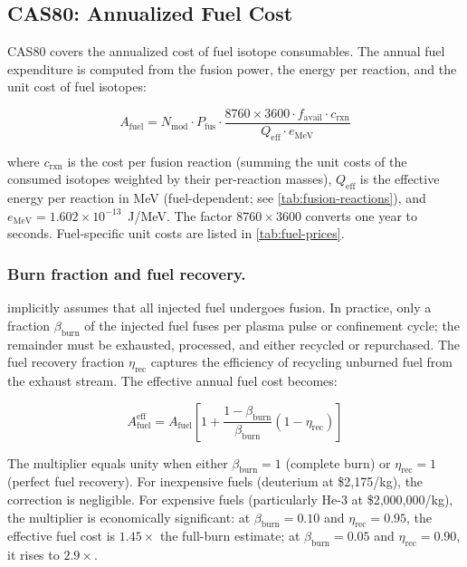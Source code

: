 \documentclass{article}
\begin{document}
\subsection{CAS80: Annualized Fuel Cost}
\label{sec:cas80}

CAS80 covers the annualized cost of fuel isotope consumables. The
annual fuel expenditure is computed from the fusion power, the
energy per reaction, and the unit cost of fuel isotopes:

\begin{equation}
\label{eq:cas80-base}
A_{\text{fuel}} = N_{\text{mod}} \cdot P_{\text{fus}} \cdot
  \frac{8760 \times 3600 \cdot f_{\text{avail}} \cdot c_{\text{rxn}}}
       {Q_{\text{eff}} \cdot e_{\text{MeV}}}
\end{equation}

\noindent where $c_{\text{rxn}}$ is the cost per fusion reaction
(summing the unit costs of the consumed isotopes weighted by their
per-reaction masses), $Q_{\text{eff}}$ is the effective energy per
reaction in MeV (fuel-dependent; see \cref{tab:fusion-reactions}), and
$e_{\text{MeV}} = 1.602 \times 10^{-13}$~J/MeV. The factor
$8760 \times 3600$ converts one year to seconds. Fuel-specific
unit costs are listed in \cref{tab:fuel-prices}.

\subsubsection{Burn fraction and fuel recovery.}
 implicitly assumes that all injected fuel
undergoes fusion. In practice, only a fraction $\beta_{\text{burn}}$
of the injected fuel fuses per plasma pulse or confinement cycle;
the remainder must be exhausted, processed, and either recycled or
repurchased. The fuel recovery fraction $\eta_{\text{rec}}$ captures
the efficiency of recycling unburned fuel from the exhaust stream.
The effective annual fuel cost becomes:

\begin{equation}
\label{eq:cas80-burn}
A_{\text{fuel}}^{\text{eff}} = A_{\text{fuel}} \left[
  1 + \frac{1 - \beta_{\text{burn}}}{\beta_{\text{burn}}}
      \left(1 - \eta_{\text{rec}}\right)
\right]
\end{equation}

\noindent The multiplier equals unity when either
$\beta_{\text{burn}} = 1$ (complete burn) or
$\eta_{\text{rec}} = 1$ (perfect fuel recovery). For inexpensive
fuels (deuterium at \$2{,}175/kg), the correction is negligible.
For expensive fuels (particularly He-3 at \$2{,}000{,}000/kg),
the multiplier is economically significant: at
$\beta_{\text{burn}} = 0.10$ and $\eta_{\text{rec}} = 0.95$,
the effective fuel cost is $1.45\times$ the full-burn estimate;
at $\beta_{\text{burn}} = 0.05$ and $\eta_{\text{rec}} = 0.90$,
it rises to $2.9\times$.
\end{document}
